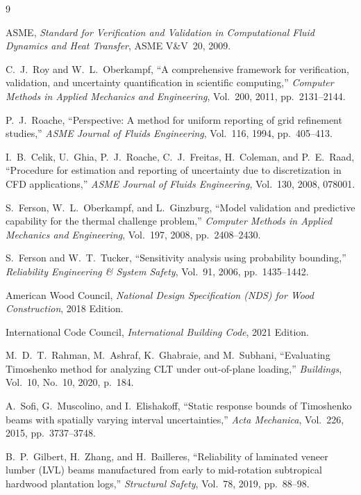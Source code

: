 \documentclass[10pt,twocolumn]{article}
\begin{document}

\begin{thebibliography}{9}

ASME,
\textit{Standard for Verification and Validation in Computational Fluid
  Dynamics and Heat Transfer}, ASME V\&V~20, 2009.

C.~J.~Roy and W.~L.~Oberkampf,
``A comprehensive framework for verification, validation, and uncertainty
  quantification in scientific computing,''
\textit{Computer Methods in Applied Mechanics and Engineering},
Vol.~200, 2011, pp.~2131--2144.

P.~J.~Roache,
``Perspective: A method for uniform reporting of grid refinement studies,''
\textit{ASME Journal of Fluids Engineering},
Vol.~116, 1994, pp.~405--413.

I.~B.~Celik, U.~Ghia, P.~J.~Roache, C.~J.~Freitas, H.~Coleman, and P.~E.~Raad,
``Procedure for estimation and reporting of uncertainty due to discretization
  in CFD applications,''
\textit{ASME Journal of Fluids Engineering}, Vol.~130, 2008, 078001.

S.~Ferson, W.~L.~Oberkampf, and L.~Ginzburg,
``Model validation and predictive capability for the thermal challenge problem,''
\textit{Computer Methods in Applied Mechanics and Engineering},
Vol.~197, 2008, pp.~2408--2430.

S.~Ferson and W.~T.~Tucker,
``Sensitivity analysis using probability bounding,''
\textit{Reliability Engineering \& System Safety},
Vol.~91, 2006, pp.~1435--1442.

American Wood Council,
\textit{National Design Specification (NDS) for Wood Construction},
2018 Edition.

International Code Council,
\textit{International Building Code}, 2021 Edition.

M.~D.~T.~Rahman, M.~Ashraf, K.~Ghabraie, and M.~Subhani,
``Evaluating Timoshenko method for analyzing CLT under out-of-plane
  loading,''
\textit{Buildings}, Vol.~10, No.~10, 2020, p.~184.

A.~Sofi, G.~Muscolino, and I.~Elishakoff,
``Static response bounds of Timoshenko beams with spatially varying
  interval uncertainties,''
\textit{Acta Mechanica}, Vol.~226, 2015, pp.~3737--3748.

B.~P.~Gilbert, H.~Zhang, and H.~Bailleres,
``Reliability of laminated veneer lumber (LVL) beams manufactured from
  early to mid-rotation subtropical hardwood plantation logs,''
\textit{Structural Safety}, Vol.~78, 2019, pp.~88--98.


\end{thebibliography}
\end{document}
